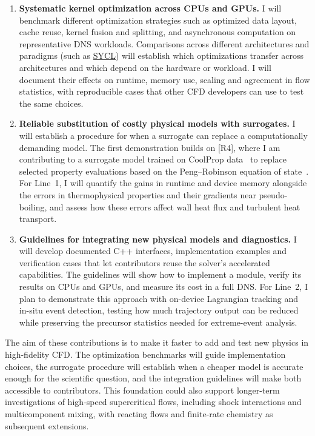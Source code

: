 \documentclass[11pt]{article}
\begin{document}
\begin{enumerate}
	\item \textbf{Systematic kernel optimization across CPUs and GPUs.}
	I will benchmark different optimization strategies such as optimized data layout, cache reuse, kernel fusion and splitting, and asynchronous computation on representative DNS workloads. Comparisons across different architectures and paradigms (such as \href{https://www.khronos.org/sycl/}{SYCL}) will establish which optimizations transfer across architectures and which depend on the hardware or workload. 
	I will document their effects on runtime, memory use, scaling and agreement in flow statistics, with reproducible cases that other CFD developers can use to test the same choices.
	
	\item \textbf{Reliable substitution of costly physical models with surrogates.}
	I will establish a procedure for when a surrogate can replace a computationally demanding model. The first demonstration builds on [R4], where I am contributing to a surrogate model trained on CoolProp data~\cite{CoolProp2014} to replace selected property evaluations based on the Peng--Robinson equation of state~\cite{PengRobinson1976}. 
	For Line~1, I will quantify the gains in runtime and device memory alongside the errors in thermophysical properties and their gradients near pseudo-boiling, and assess how these errors affect wall heat flux and turbulent heat transport.
	
	\item \textbf{Guidelines for integrating new physical models and diagnostics.}
	I will develop documented C++ interfaces, implementation examples and verification cases that let contributors reuse the solver's accelerated capabilities. The guidelines will show how to implement a module, verify its results on CPUs and GPUs, and measure its cost in a full DNS. 
	For Line~2, I plan to demonstrate this approach with on-device Lagrangian tracking and in-situ event detection, testing how much trajectory output can be reduced while preserving the precursor statistics needed for extreme-event analysis.
\end{enumerate}
The aim of these contributions is to make it faster to add and test new physics in high-fidelity CFD. 
The optimization benchmarks will guide implementation choices, the surrogate procedure will establish when a cheaper model is accurate enough for the scientific question, and the integration guidelines will make both accessible to contributors. 
This foundation could also support longer-term investigations of high-speed supercritical flows, including shock interactions and multicomponent mixing, with reacting flows and finite-rate chemistry as subsequent extensions.
\end{document}
